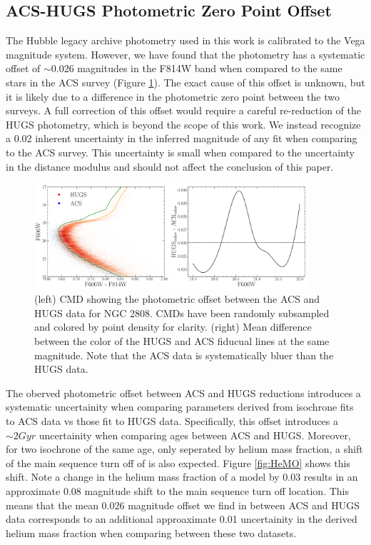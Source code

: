 \subsection{ACS-HUGS Photometric Zero Point Offset}
The Hubble legacy archive photometry used in this work is calibrated to the
Vega magnitude system. However, we have found that the photometry has a
systematic offset of $\sim0.026$ magnitudes in the F814W band when
compared to the same stars in the ACS survey (Figure \ref{fig:offset}). The
exact cause of this offset is unknown, but it is likely due to a difference in
the photometric zero point between the two surveys. A full correction of this
offset would require a careful re-reduction of the HUGS photometry, which is
beyond the scope of this work. We instead recognize a 0.02 inherent uncertainty
in the inferred magnitude of any fit when comparing to the ACS survey. This
uncertainty is small when compared to the uncertainty in the
distance modulus and should not affect the conclusion of this
paper. 

\begin{figure}
  \centering
  \includegraphics[width=0.90\textwidth]{figures/ngc2808/photometricOffset.pdf}
  \caption{(left) CMD showing the photometric offset between the ACS and HUGS data for NGC 2808. CMDs have been randomly subsampled and colored by point density for clarity. (right) Mean difference between the color of the HUGS and ACS fiducual lines at the same magnitude. Note that the ACS data is systematically bluer than the HUGS data.}
  \label{fig:offset}
\end{figure}

The oberved photometric offset between ACS and HUGS reductions introduces a
systematic uncertainity when comparing parameters derived from isochrone fits
to ACS data vs those fit to HUGS data. Specifically, this offset introduces a
$\sim 2 Gyr$ uncertainity when comparing ages between ACS and HUGS. Moreover,
for two isochrone of the same age, only seperated by helium mass fraction, a
shift of the main sequence turn off of is also expected. Figure \ref{fig:HeMO}
shows this shift. Note a change in the helium mass fraction of a model by 0.03
results in an approximate 0.08 magnitude shift to the main sequence turn off
location. This means that the mean 0.026 magnitude offset we find in between
ACS and HUGS data corresponds to an additional approaximate 0.01 uncertainity
in the derived helium mass fraction when comparing between these two datasets. 

